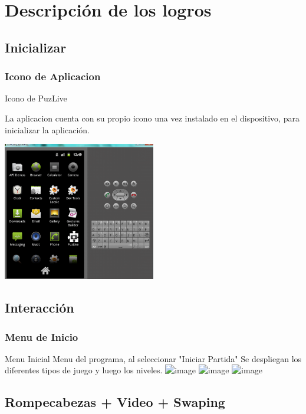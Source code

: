 \documentclass[serif,11pt]{beamer}
\begin{document}
		

	\section{Descripci\'on de los logros} 
		\subsection{Inicializar}


		\begin{frame}
			\frametitle{Icono de Aplicacion}

			\begin{block}{Icono de PuzLive}
					
				La aplicacion cuenta con su propio icono una vez instalado en el dispositivo, para inicializar la aplicaci\'on.
					
						\includegraphics[width=0.5\textwidth]{outmenu} 
						\bigskip
				
				\end{block}
		\end{frame}




		\subsection{Interacci\'on}
		\begin{frame}
			\frametitle{Menu de Inicio}
				\begin{block}{Menu Inicial}
				Menu del programa, al seleccionar "Iniciar Partida" Se despliegan los diferentes tipos de juego y luego los niveles.
				\includegraphics<1>[height=5cm]{menuPrin} 
				\includegraphics<2>[height=5cm]{dosgame} 
				\includegraphics<3>[height=5cm]{niveles} 
				\end{block}
		\end{frame}

		
		
		\subsection{Rompecabezas + Video + Swaping}
\end{document}
